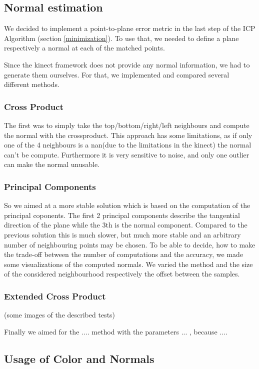 \documentclass[10pt,twocolumn,letterpaper]{article}
\begin{document}
\subsection{Normal estimation}

We decided to implement a point-to-plane error metric in the last step of the ICP Algorithm (section \ref{minimization}). To use that, we needed to define a plane respectively a normal at each of the matched points.

Since the kinect framework does not provide any normal information, we had to generate them ourselves. For that, we implemented and compared several different methods.

\subsubsection{Cross Product}
The first was to simply take the top/bottom/right/left neighbours and compute the normal with the crossproduct.
This approach has some limitations, as if only one of the 4 neighbours is a nan(due to the limitations in the kinect) the normal can't be compute. Furthermore it is very sensitive to noise, and only one outlier can make the normal unusable.

\subsubsection{Principal Components}
So we aimed at a more stable solution which is based on the computation of the principal coponents. 
The first 2 principal components describe the tangential direction of the plane while the 3th is the normal component.
Compared to the previous solution this is much slower, but much more stable and an arbitrary number of neighbouring points may be chosen.
To be able to decide, how to make the trade-off between the number of computations and the accuracy, we made some visualizations of the computed normals.
We varied the method and the size of the considered neighbourhood respectively the offset between the samples.

\subsubsection{Extended Cross Product}

(some images of the described tests)

Finally we aimed for the .... method with the parameters ... , because ....

\subsection{Usage of Color and Normals}
\end{document}

